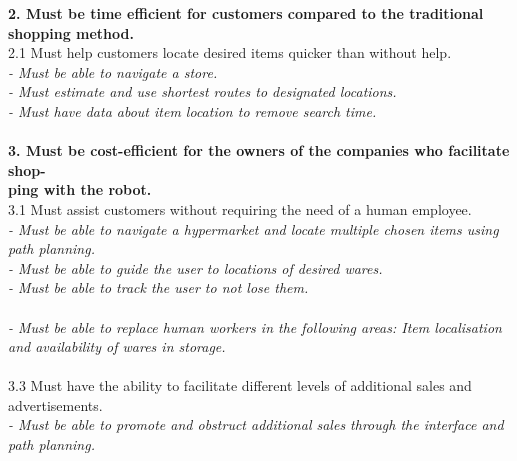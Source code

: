 \textbf{2. Must be time efficient for customers compared to the traditional shopping \hspace*{5.5mm}method.}\\
\hspace*{3mm} 2.1 Must help customers locate desired items quicker than without help.\\
\hspace*{9mm}\textit{- Must be able to navigate a store.}\\
\hspace*{9mm}\textit{- Must estimate and use shortest routes to designated locations.}\\
\hspace*{9mm}\textit{- Must have data about item location to remove search time.}\\
\\
\textbf{3. Must be cost-efficient for the owners of the companies who facilitate shop-\\\hspace*{4.5mm}ping with the robot.}\\
\hspace*{3mm} 3.1 Must assist customers without requiring the need of a human employee.\\
\hspace*{9mm}\textit{- Must be able to navigate a hypermarket and locate multiple chosen items using \hspace*{12mm}path planning.}\\
\hspace*{9mm}\textit{- Must be able to guide the user to locations of desired wares.}\\
\hspace*{9mm}\textit{- Must be able to track the user to not lose them.}\\

\\
\hspace*{9mm}\textit{- Must be able to replace human workers in the following areas: Item localisation and 
\hspace*{12mm}availability of wares in storage.}\\
\\
\hspace*{1.5mm} 3.3 Must have the ability to facilitate different levels of additional sales and \hspace*{10.5mm}advertisements.\\
\hspace*{9mm}\textit{- Must be able to promote and obstruct additional sales through the interface and \hspace*{12mm}path planning.}\\



